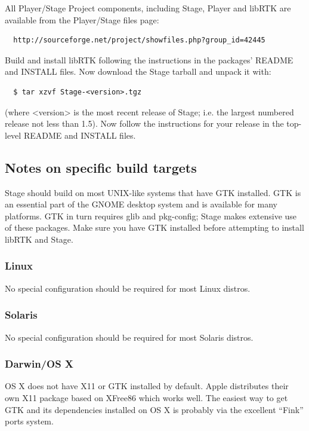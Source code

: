 \documentclass[letter,11pt,twoside]{report}
\begin{document}
All Player/Stage Project components, including Stage, Player and
libRTK are available from the Player/Stage files page:

\begin{verbatim}
  http://sourceforge.net/project/showfiles.php?group_id=42445
\end{verbatim}

\noindent Build and install libRTK following the
instructions in the packages' README and INSTALL files. Now
download the Stage tarball and unpack it with:
\begin{verbatim}
  $ tar xzvf Stage-<version>.tgz
\end{verbatim}
\noindent (where <version> is the most recent release of Stage;
i.e. the largest numbered release not less than 1.5). Now follow the
instructions for your release in the top-level README and INSTALL
files.

\subsection{Notes on specific build targets}

Stage should build on most UNIX-like systems that have GTK
installed. GTK is an essential part of the GNOME desktop system and is
available for many platforms. GTK in turn requires glib and
pkg-config; Stage makes extensive use of these packages. Make sure you
have GTK installed before attempting to install libRTK and Stage.

\subsubsection{Linux}
No special configuration should be required for most Linux distros.

\subsubsection{Solaris}

No special configuration should be required for most Solaris distros.

\subsubsection{Darwin/OS X}
OS X does not have X11 or GTK installed by default. Apple distributes
their own X11 package based on XFree86 which works well. The easiest
way to get GTK and its dependencies installed on OS X is probably via
the excellent ``Fink'' ports system.
\end{document}
